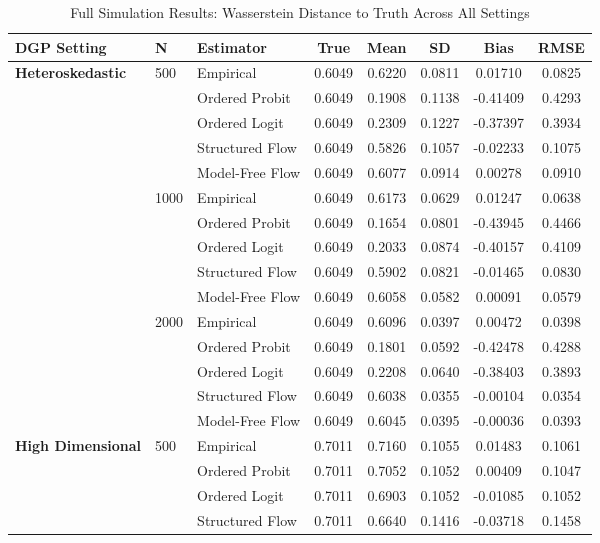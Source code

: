 \begin{table}[p]
\centering
\small
\caption{Full Simulation Results: Wasserstein Distance to Truth Across All Settings}
\label{tab:app_full_wasserstein}
\begin{tabular}{lllccccc}
\toprule
\textbf{DGP Setting} & \textbf{N} & \textbf{Estimator} & \textbf{True} & \textbf{Mean} & \textbf{SD} & \textbf{Bias} & \textbf{RMSE} \\
\midrule
\textbf{Heteroskedastic} & 500 & Empirical & 0.6049 & 0.6220 & 0.0811 & 0.01710 & 0.0825 \\
 &  & Ordered Probit & 0.6049 & 0.1908 & 0.1138 & -0.41409 & 0.4293 \\
 &  & Ordered Logit & 0.6049 & 0.2309 & 0.1227 & -0.37397 & 0.3934 \\
 &  & Structured Flow & 0.6049 & 0.5826 & 0.1057 & -0.02233 & 0.1075 \\
 &  & Model-Free Flow & 0.6049 & 0.6077 & 0.0914 & 0.00278 & 0.0910 \\
\cline{2-8}
 & 1000 & Empirical & 0.6049 & 0.6173 & 0.0629 & 0.01247 & 0.0638 \\
 &  & Ordered Probit & 0.6049 & 0.1654 & 0.0801 & -0.43945 & 0.4466 \\
 &  & Ordered Logit & 0.6049 & 0.2033 & 0.0874 & -0.40157 & 0.4109 \\
 &  & Structured Flow & 0.6049 & 0.5902 & 0.0821 & -0.01465 & 0.0830 \\
 &  & Model-Free Flow & 0.6049 & 0.6058 & 0.0582 & 0.00091 & 0.0579 \\
\cline{2-8}
 & 2000 & Empirical & 0.6049 & 0.6096 & 0.0397 & 0.00472 & 0.0398 \\
 &  & Ordered Probit & 0.6049 & 0.1801 & 0.0592 & -0.42478 & 0.4288 \\
 &  & Ordered Logit & 0.6049 & 0.2208 & 0.0640 & -0.38403 & 0.3893 \\
 &  & Structured Flow & 0.6049 & 0.6038 & 0.0355 & -0.00104 & 0.0354 \\
 &  & Model-Free Flow & 0.6049 & 0.6045 & 0.0395 & -0.00036 & 0.0393 \\
\midrule
\textbf{High Dimensional} & 500 & Empirical & 0.7011 & 0.7160 & 0.1055 & 0.01483 & 0.1061 \\
 &  & Ordered Probit & 0.7011 & 0.7052 & 0.1052 & 0.00409 & 0.1047 \\
 &  & Ordered Logit & 0.7011 & 0.6903 & 0.1052 & -0.01085 & 0.1052 \\
 &  & Structured Flow & 0.7011 & 0.6640 & 0.1416 & -0.03718 & 0.1458 \\

\end{tabular}
\end{table}
